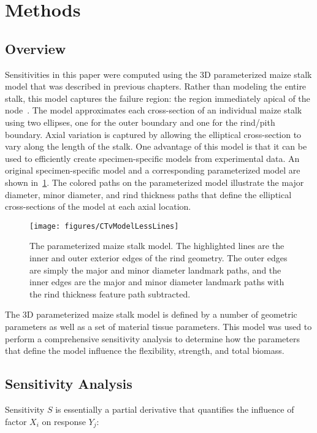 \section{Methods}
\label{sec:ch4_methods}

\subsection{Overview}
\label{ssec:ch4_overview}
Sensitivities in this paper were computed using the 3D parameterized maize stalk model that was described in previous chapters. Rather than modeling the entire stalk, this model captures the failure region: the region immediately apical of the node~. The model approximates each cross-section of an individual maize stalk using two ellipses, one for the outer boundary and one for the rind/pith boundary. Axial variation is captured by allowing the elliptical cross-section to vary along the length of the stalk. One advantage of this model is that it can be used to efficiently create specimen-specific models from experimental data. An original specimen-specific model and a corresponding parameterized model are shown in~\cref{fig:CTvModelLessLines}. The colored paths on the parameterized model illustrate the major diameter, minor diameter, and rind thickness paths that define the elliptical cross-sections of the model at each axial location.

\begin{figure}[htbp]
	\centering
	\texttt{[image: figures/CTvModelLessLines]}
	\caption[The parameterized maize stalk model.]{The parameterized maize stalk model. The highlighted lines are the inner and outer exterior edges of the rind geometry. The outer edges are simply the major and minor diameter landmark paths, and the inner edges are the major and minor diameter landmark paths with the rind thickness feature path subtracted. }
	\label{fig:CTvModelLessLines}
\end{figure}

The 3D parameterized maize stalk model is defined by a number of geometric parameters as well as a set of material tissue parameters. This model was used to perform a comprehensive sensitivity analysis to determine how the parameters that define the model influence the flexibility, strength, and total biomass.

\subsection{Sensitivity Analysis}
\label{ssec:sensitivity_analysis}
Sensitivity ${S}$ is essentially a partial derivative that quantifies the influence of factor ${X_{i}}$ on response ${Y_{j}}$:

